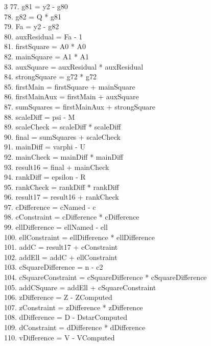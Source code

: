 \documentclass[10pt]{article}
\begin{document}
\begin{multicols}{3}
77. g81 = y2 - g80\\
78. g82 = Q * g81\\
79. Fa = y2 - g82\\
80. auxResidual = Fa - 1\\
81. firstSquare = A0 * A0\\
82. mainSquare = A1 * A1\\
83. auxSquare = auxResidual * auxResidual\\
84. strongSquare = g72 * g72\\
85. firstMain = firstSquare + mainSquare\\
86. firstMainAux = firstMain + auxSquare\\
87. sumSquares = firstMainAux + strongSquare\\
88. scaleDiff = psi - M\\
89. scaleCheck = scaleDiff * scaleDiff\\
90. final = sumSquares + scaleCheck\\
91. mainDiff = varphi - U\\
92. mainCheck = mainDiff * mainDiff\\
93. result16 = final + mainCheck\\
94. rankDiff = epsilon - R\\
95. rankCheck = rankDiff * rankDiff\\
96. result17 = result16 + rankCheck\\
97. cDifference = cNamed - c\\
98. cConstraint = cDifference * cDifference\\
99. ellDifference = ellNamed - ell\\
100. ellConstraint = ellDifference * ellDifference\\
101. addC = result17 + cConstraint\\
102. addEll = addC + ellConstraint\\
103. cSquareDifference = n - c2\\
104. cSquareConstraint = cSquareDifference * cSquareDifference\\
105. addCSquare = addEll + cSquareConstraint\\
106. zDifference = Z - ZComputed\\
107. zConstraint = zDifference * zDifference\\
108. dDifference = D - DstarComputed\\
109. dConstraint = dDifference * dDifference\\
110. vDifference = V - VComputed\\

\end{multicols}
\end{document}
